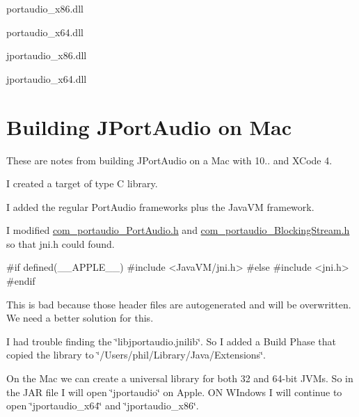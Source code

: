 \begin{DoxyItemize}
\item portaudio\+\_\+x86.\+dll
\item portaudio\+\_\+x64.\+dll
\item jportaudio\+\_\+x86.\+dll
\item jportaudio\+\_\+x64.\+dll
\end{DoxyItemize}\hypertarget{java_binding_java_comp_max}{}\section{Building J\+Port\+Audio on Mac}\label{java_binding_java_comp_max}
These are notes from building J\+Port\+Audio on a Mac with 10.. and X\+Code 4.

I created a target of type \textquotesingle{}C\textquotesingle{} library.

I added the regular Port\+Audio frameworks plus the Java\+VM framework.

I modified \hyperlink{com__portaudio___port_audio_8h}{com\+\_\+portaudio\+\_\+\+Port\+Audio.\+h} and \hyperlink{com__portaudio___blocking_stream_8h}{com\+\_\+portaudio\+\_\+\+Blocking\+Stream.\+h} so that jni.\+h could found.


\begin{DoxyCode}
\textcolor{preprocessor}{#if defined(\_\_APPLE\_\_)}
\textcolor{preprocessor}{#include <JavaVM/jni.h>}
\textcolor{preprocessor}{#else}
\textcolor{preprocessor}{#include <jni.h>}
\textcolor{preprocessor}{#endif}
\end{DoxyCode}


This is bad because those header files are autogenerated and will be overwritten. We need a better solution for this.

I had trouble finding the \char`\"{}libjportaudio.\+jnilib\char`\"{}. So I added a Build Phase that copied the library to \char`\"{}/\+Users/phil/\+Library/\+Java/\+Extensions\char`\"{}.

On the Mac we can create a universal library for both 32 and 64-\/bit J\+V\+Ms. So in the J\+AR file I will open \char`\"{}jportaudio\char`\"{} on Apple. ON W\+Indows I will continue to open \char`\"{}jportaudio\+\_\+x64\char`\"{} and \char`\"{}jportaudio\+\_\+x86\char`\"{}. 